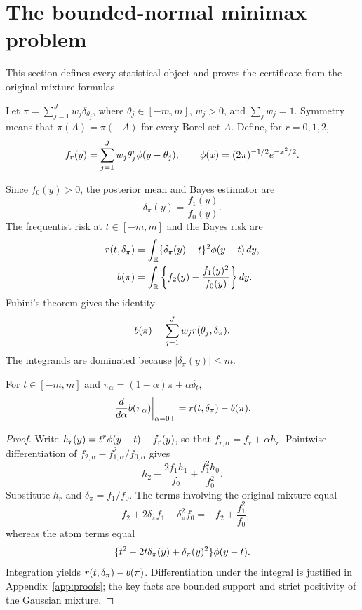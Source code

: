 \section{The bounded-normal minimax problem}
\label{sec:formulation}

This section defines every statistical object and proves the certificate from
the original mixture formulas.

\begin{definition}
Let $\pi=\sum_{j=1}^J w_j\delta_{\theta_j}$, where
$\theta_j\in[-m,m]$, $w_j>0$, and $\sum_jw_j=1$.  Symmetry means that
$\pi(A)=\pi(-A)$ for every Borel set $A$.  Define, for $r=0,1,2$,
\[
 f_r(y)=\sum_{j=1}^J w_j\theta_j^r\phi(y-\theta_j),
 \qquad
 \phi(x)=(2\pi)^{-1/2}e^{-x^2/2}.
\]
\end{definition}

Since $f_0(y)>0$, the posterior mean and Bayes estimator are
\[
  \delta_\pi(y)=\frac{f_1(y)}{f_0(y)}.
\]
The frequentist risk at $t\in[-m,m]$ and the Bayes risk are
\begin{align}
  r(t,\delta_\pi)
   &=\int_{\mathbb R}\{\delta_\pi(y)-t\}^2\phi(y-t)\,dy, \label{eq:risk}\\
  b(\pi)
   &=\int_{\mathbb R}\left\{f_2(y)-\frac{f_1(y)^2}{f_0(y)}\right\}dy. \label{eq:bayes}
\end{align}
Fubini's theorem gives the identity
\begin{equation}
  b(\pi)=\sum_{j=1}^Jw_jr(\theta_j,\delta_\pi).
  \label{eq:bayes-average}
\end{equation}
The integrands are dominated because $|\delta_\pi(y)|\le m$.

\begin{proposition}
\label{prop:direction}
For $t\in[-m,m]$ and $\pi_\alpha=(1-\alpha)\pi+\alpha\delta_t$,
\[
 \left.\frac{d}{d\alpha}b(\pi_\alpha)\right|_{\alpha=0+}
 =r(t,\delta_\pi)-b(\pi).
\]
\end{proposition}

\begin{proof}
Write $h_r(y)=t^r\phi(y-t)-f_r(y)$, so that
$f_{r,\alpha}=f_r+\alpha h_r$.  Pointwise differentiation of
$f_{2,\alpha}-f_{1,\alpha}^2/f_{0,\alpha}$ gives
\[
 h_2-\frac{2f_1h_1}{f_0}+\frac{f_1^2h_0}{f_0^2}.
\]
Substitute $h_r$ and $\delta_\pi=f_1/f_0$.  The terms involving the original
mixture equal
\[
 -f_2+2\delta_\pi f_1-\delta_\pi^2f_0
 =-f_2+\frac{f_1^2}{f_0},
\]
whereas the atom terms equal
\[
 \{t^2-2t\delta_\pi(y)+\delta_\pi(y)^2\}\phi(y-t).
\]
Integration yields $r(t,\delta_\pi)-b(\pi)$.  Differentiation under the
integral is justified in Appendix~\ref{app:proofs}; the key facts are bounded
support and strict positivity of the Gaussian mixture.
\end{proof}

